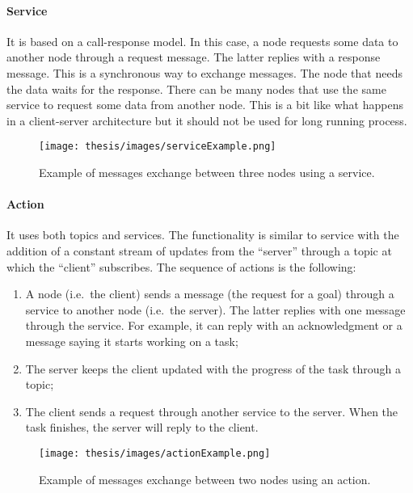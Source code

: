 \documentclass[../thesis.tex]{subfiles}
\begin{document}
\paragraph{Service}
It is based on a call-response model. In this case, a node requests some data to another node through a request message. The latter replies with a response message. This is a synchronous way to exchange messages. The node that needs the data waits for the response. There can be many nodes that use the same service to request some data from another node. This is a bit like what happens in a client-server architecture but it should not be used for long running process.
\begin{figure}[H]
    \centering
    \texttt{[image: thesis/images/serviceExample.png]}
    \caption{Example of messages exchange between three nodes using a service.}
    \label{fig:exampleServiceExchangeMessage}
\end{figure}

\paragraph{Action}
It uses both topics and services. The functionality is similar to service with the addition of a constant stream of updates from the ``server'' through a topic at which the ``client'' subscribes. The sequence of actions is the following:
    \begin{enumerate}
        \item A node (i.e.\ the client) sends a message (the request for a goal) through a service to another node (i.e.\ the server). The latter replies with one message through the service. For example, it can reply with an acknowledgment or a message saying it starts working on a task;
        \item The server keeps the client updated with the progress of the task through a topic;
        \item The client sends a request through another service to the server. When the task finishes, the server will reply to the client.
    \end{enumerate}
\begin{figure}[H]
    \centering
    \texttt{[image: thesis/images/actionExample.png]}
    \caption{Example of messages exchange between two nodes using an action.}
    \label{fig:exampleActionExchangeMessage}
\end{figure}
\end{document}
